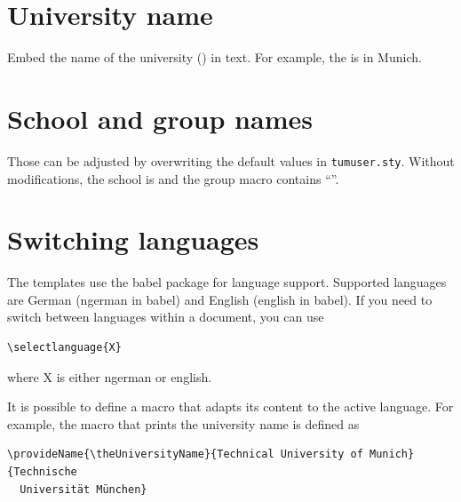 \tableofcontents

\section{University name}

Embed the name of the university (\theUniversityName{}) in text. For example,
the \theUniversityName{} is in Munich.

\section{School and group names}

Those can be adjusted by overwriting the default values in
\texttt{tumuser.sty}. Without modifications, the school is
\theSchoolName{} and the group macro contains ``\theGroupName{}''.

\section{Switching languages}

The templates use the babel package for language support. Supported languages
are German (ngerman in babel) and English (english in babel). If you need to
switch between languages within a document, you can use
\begin{verbatim}
\selectlanguage{X}
\end{verbatim}
where X is either ngerman or english.

It is possible to define a macro that adapts its content to the active
language. For example, the macro that prints the university name is defined
as
\begin{verbatim}
\provideName{\theUniversityName}{Technical University of Munich}{Technische
  Universität München}
\end{verbatim}
